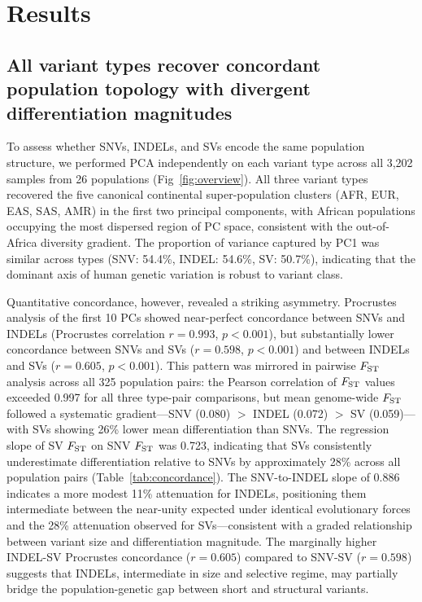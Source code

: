 \section*{Results}

\subsection*{All variant types recover concordant population topology with divergent differentiation magnitudes}

To assess whether SNVs, INDELs, and SVs encode the same population structure, we performed PCA independently on each variant type across all 3,202 samples from 26 populations (Fig~\ref{fig:overview}). All three variant types recovered the five canonical continental super-population clusters (AFR, EUR, EAS, SAS, AMR) in the first two principal components, with African populations occupying the most dispersed region of PC space, consistent with the out-of-Africa diversity gradient. The proportion of variance captured by PC1 was similar across types (SNV: 54.4\%, INDEL: 54.6\%, SV: 50.7\%), indicating that the dominant axis of human genetic variation is robust to variant class.

Quantitative concordance, however, revealed a striking asymmetry. Procrustes analysis of the first 10 PCs showed near-perfect concordance between SNVs and INDELs (Procrustes correlation $r = 0.993$, $p < 0.001$), but substantially lower concordance between SNVs and SVs ($r = 0.598$, $p < 0.001$) and between INDELs and SVs ($r = 0.605$, $p < 0.001$). This pattern was mirrored in pairwise $F_\mathrm{ST}$ analysis across all 325 population pairs: the Pearson correlation of $F_\mathrm{ST}$ values exceeded 0.997 for all three type-pair comparisons, but mean genome-wide $F_\mathrm{ST}$ followed a systematic gradient---SNV (0.080) $>$ INDEL (0.072) $>$ SV (0.059)---with SVs showing 26\% lower mean differentiation than SNVs. The regression slope of SV $F_\mathrm{ST}$ on SNV $F_\mathrm{ST}$ was 0.723, indicating that SVs consistently underestimate differentiation relative to SNVs by approximately 28\% across all population pairs (Table~\ref{tab:concordance}). The SNV-to-INDEL slope of 0.886 indicates a more modest 11\% attenuation for INDELs, positioning them intermediate between the near-unity expected under identical evolutionary forces and the 28\% attenuation observed for SVs---consistent with a graded relationship between variant size and differentiation magnitude. The marginally higher INDEL-SV Procrustes concordance ($r = 0.605$) compared to SNV-SV ($r = 0.598$) suggests that INDELs, intermediate in size and selective regime, may partially bridge the population-genetic gap between short and structural variants.

